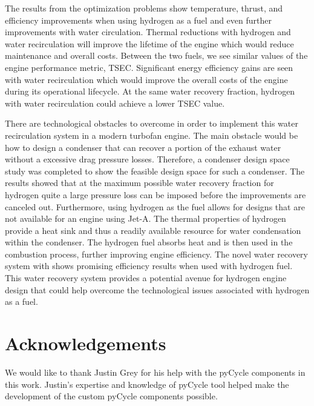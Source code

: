 \documentclass[conf]{new-aiaa}
\begin{document}
The results from the optimization problems show temperature, thrust, and efficiency improvements when using hydrogen as a fuel and even further improvements with water circulation.
Thermal reductions with hydrogen and water recirculation will improve the lifetime of the engine which would reduce maintenance and overall costs.
Between the two fuels, we see similar values of the engine performance metric, TSEC.
Significant energy efficiency gains are seen with water recirculation which would improve the overall costs of the engine during its operational lifecycle.
At the same water recovery fraction, hydrogen with water recirculation could achieve a lower TSEC value.

There are technological obstacles to overcome in order to implement this water recirculation system in a modern turbofan engine.
The main obstacle would be how to design a condenser that can recover a portion of the exhaust water without a excessive drag pressure losses.
Therefore, a condenser design space study was completed to show the feasible design space for such a condenser.
The results showed that at the maximum possible water recovery fraction for hydrogen quite a large pressure loss can be imposed before the improvements are canceled out.
Furthermore, using hydrogen as the fuel allows for designs that are not available for an engine using Jet-A.
The thermal properties of hydrogen provide a heat sink and thus a readily available resource for water condensation within the condenser.
The hydrogen fuel absorbs heat and is then used in the combustion process, further improving engine efficiency.
The novel water recovery system with shows promising efficiency results when used with hydrogen fuel.
This water recovery system provides a potential avenue for hydrogen engine design that could help overcome the technological issues associated with hydrogen as a fuel.

\section{Acknowledgements}
We would like to thank Justin Grey for his help with the pyCycle components in this work.
Justin's expertise and knowledge of pyCycle tool helped make the development of the custom pyCycle components possible.


\end{document}
